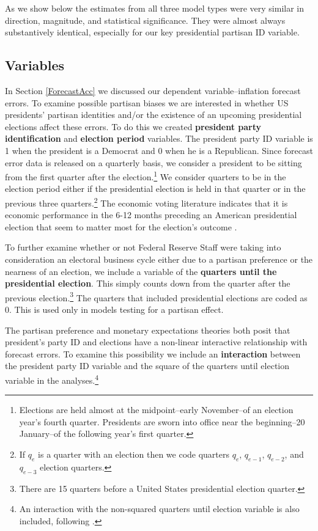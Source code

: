 \documentclass[a4paper]{article}
\begin{document}
As we show below the estimates from all three model types were very similar in direction, magnitude, and statistical significance. They were almost always substantively identical, especially for our key presidential partisan ID variable. 

\subsection{Variables}

In Section \ref{ForecastAcc} we discussed our dependent variable--inflation forecast errors. To examine possible partisan biases we are interested in whether US presidents' partisan identities and/or the existence of an upcoming presidential elections affect these errors. To do this we created {\bf{president party identification}} and {\bf{election period}} variables. The president party ID variable is 1 when the president is a Democrat and 0 when he is a Republican. Since forecast error data is released on a quarterly basis, we consider a president to be sitting from the first quarter after the election.\footnote{Elections are held almost at the midpoint--early November--of an election year's fourth quarter. Presidents are sworn into office near the beginning--20 January--of the following year's first quarter.} We consider quarters to be in the election period either if the presidential election is held in that quarter or in the previous three quarters.\footnote{If $q_{e}$ is a quarter with an election then we code quarters $q_{e}$, $q_{e-1}$, $q_{e-2}$, and $q_{e-3}$ election quarters.} The economic voting literature indicates that it is economic performance in the 6-12 months preceding an American presidential election that seem to matter most for the election's outcome \citep[c.f][]{Gelman1993}. 

To further examine whether or not Federal Reserve Staff were taking into consideration an electoral business cycle either due to a partisan preference or the nearness of an election, we include a variable of the {\bf{quarters until the presidential election}}. This simply counts down from the quarter after the previous election.\footnote{There are 15 quarters before a United States presidential election quarter.} The quarters that included presidential elections are coded as 0. This is used only in models testing for a partisan effect.

The partisan preference and monetary expectations theories both posit that president's party ID and elections have a non-linear interactive relationship with forecast errors. To examine this possibility we include an \textbf{interaction} between the president party ID variable and the square of the quarters until election variable in the analyses.\footnote{An interaction with the non-squared quarters until election variable is also included, following \citep{Brambor2006}.}
\end{document}
